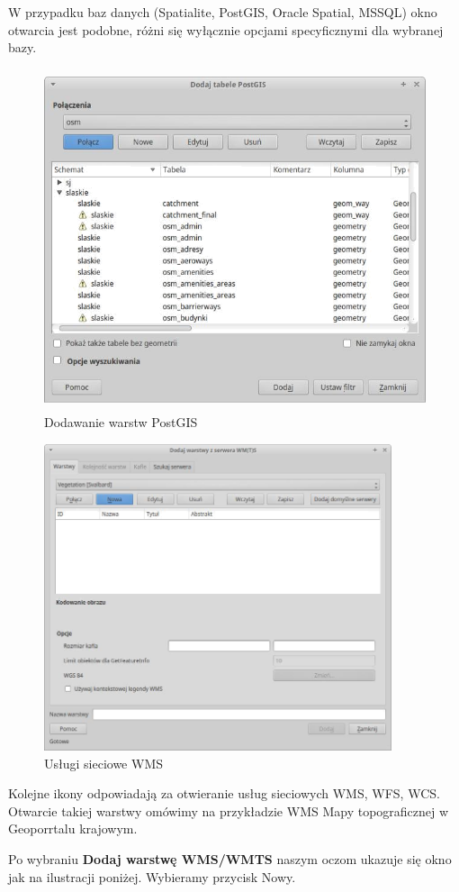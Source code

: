 \documentclass[12pt,a4paper]{book}
\begin{document}
W przypadku baz danych (Spatialite, PostGIS, Oracle Spatial, MSSQL) okno otwarcia jest podobne, różni się wyłącznie opcjami specyficznymi dla wybranej bazy.
\begin{figure}[ht]
	\centering
	\includegraphics[height=10cm]{002-dodaj-postgis.png}
	\caption{Dodawanie warstw PostGIS}
\end{figure}
\begin{figure}[ht]
	\centering
	\includegraphics[height=9cm]{002-dodaj-wms.png}
	\caption{Usługi sieciowe WMS}
\end{figure}
Kolejne ikony odpowiadają za otwieranie usług sieciowych WMS, WFS, WCS. Otwarcie takiej warstwy omówimy na przykładzie WMS Mapy topograficznej w Geoporrtalu krajowym.

Po wybraniu \textbf{Dodaj warstwę WMS/WMTS} naszym oczom ukazuje się okno jak na ilustracji poniżej. Wybieramy przycisk Nowy.
\end{document}
